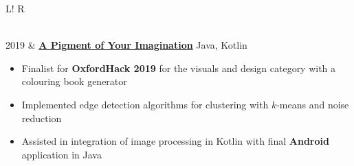 \documentclass[10pt, a4paper]{article}
\newcommand\vsep{\color{lightgray} \vrule width 0.5pt}
\newcommand\itemizespace{\vspace{-0.65\baselineskip}}
\newcommand\tspace{\hfill}
\begin{document}
\begin{tabular}{L!{\vsep}R}
\begin{itemize}[label=\raisebox{0.25ex}{\tiny$\bullet$}]
                        \itemizespace
                    \end{itemize} \\
                2019 & \href{https://devpost.com/software/bucket-hsk7a1}{\textbf{A Pigment of Your Imagination}} \tspace Java, Kotlin
                    \begin{itemize}[label=\raisebox{0.25ex}{\tiny$\bullet$}]
                        \setlength{\itemindent}{-0.125in}
                        \item Finalist for \textbf{OxfordHack 2019} for the visuals and design category with a colouring book generator
                        \item Implemented edge detection algorithms for clustering with $k$-means and noise reduction
                        \item Assisted in integration of image processing in Kotlin with final \textbf{Android} application in Java
                        \itemizespace
                    \end{itemize} \\

\end{tabular}
\end{document}
